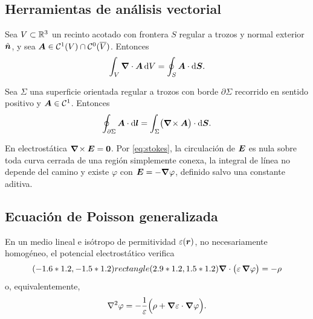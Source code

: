 \documentclass[11pt,a4paper,twoside]{article}
\begin{document}
\subsection{Herramientas de análisis vectorial}

\begin{teorema}\label{teo:gauss}
Sea $V\subset\mathbb{R}^{3}$ un recinto acotado con frontera $S$ regular a trozos y normal exterior
$\hat{\bm{n}}$, y sea $\bm{A}\in\mathcal{C}^{1}(V)\cap\mathcal{C}^{0}(\overline{V})$. Entonces
\begin{equation}\label{eq:gauss}
  \int_{V}\bm{\nabla}\cdot\bm{A}\,\mathrm{d} V=\oint_{S}\bm{A}\cdot\mathrm{d}\bm{S} .
\end{equation}
\end{teorema}

\begin{teorema}[de Stokes]\label{teo:stokes}
Sea $\Sigma$ una superficie orientada regular a trozos con borde $\partial\Sigma$ recorrido
en sentido positivo y $\bm{A}\in\mathcal{C}^{1}$. Entonces
\begin{equation}\label{eq:stokes}
  \oint_{\partial\Sigma}\bm{A}\cdot\mathrm{d}\bm{l}=\int_{\Sigma}\bigl(\bm{\nabla}\!\times\bm{A}\bigr)\cdot\mathrm{d}\bm S .
\end{equation}
\end{teorema}

\begin{observacion}
En electrostática $\bm{\nabla}\!\times\bm{E}=\bm 0$. Por \eqref{eq:stokes}, la circulación de $\bm{E}$ es nula
sobre toda curva cerrada de una región simplemente conexa, la integral de línea no depende
del camino y existe $\varphi$ con $\bm{E}=-\bm{\nabla}\varphi$, definido salvo una constante aditiva.
\end{observacion}

\subsection{Ecuación de Poisson generalizada}

\begin{proposicion}\label{prop:poisson}
En un medio lineal e isótropo de permitividad $\varepsilon(\bm{r})$, no necesariamente homogéneo, el
potencial electrostático verifica
\begin{equation}\label{eq:poisson-gen}
  (-1.6*1.2,-1.5*1.2) rectangle (2.9*1.2,1.5*1.2){\bm{\nabla}\cdot\bigl(\varepsilon\,\bm{\nabla}\varphi\bigr)=-\rho}
\end{equation}
o, equivalentemente,
\begin{equation}\label{eq:poisson-desarrollada}
  \nabla^{2}\varphi=-\frac{1}{\varepsilon}\Bigl(\rho+\bm{\nabla}\varepsilon\cdot\bm{\nabla}\varphi\Bigr).
\end{equation}
\end{proposicion}
\end{document}
